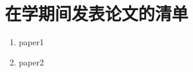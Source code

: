 \chapter*{在学期间发表论文的清单}
\thispagestyle{main}

\begin{enumerate}
  \item paper1
  \item paper2
\end{enumerate}
